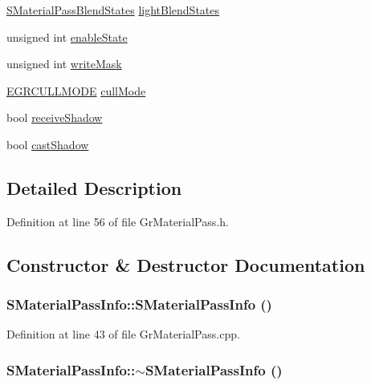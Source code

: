 \begin{CompactItemize}
\item 
\hyperlink{struct_s_material_pass_blend_states}{SMaterialPassBlendStates} \hyperlink{struct_s_material_pass_info_1bb1369eafd762e7b2adc9b456fae885}{lightBlendStates}
\item 
unsigned int \hyperlink{struct_s_material_pass_info_b4f60776995332748e40270d6c2dc318}{enableState}
\item 
unsigned int \hyperlink{struct_s_material_pass_info_06ba69d3100e1ce0a27d8da74c1f342d}{writeMask}
\item 
\hyperlink{_gr_util_8h_ea790ef067767354691d0d60c51542fe}{EGRCULLMODE} \hyperlink{struct_s_material_pass_info_1c5a2ded6a57901feed193d620db014e}{cullMode}
\item 
bool \hyperlink{struct_s_material_pass_info_47b874b3efb05afc0ccbecc01ebf62bc}{receiveShadow}
\item 
bool \hyperlink{struct_s_material_pass_info_148b9b02c76e38c6be30dc599ad35dad}{castShadow}
\end{CompactItemize}


\subsection{Detailed Description}


Definition at line 56 of file GrMaterialPass.h.

\subsection{Constructor \& Destructor Documentation}
\hypertarget{struct_s_material_pass_info_188cd731132ec93cdb46f1b94a34d9eb}{
\subsubsection[{SMaterialPassInfo}]{\setlength{\rightskip}{0pt plus 5cm}SMaterialPassInfo::SMaterialPassInfo ()}}
\label{struct_s_material_pass_info_188cd731132ec93cdb46f1b94a34d9eb}




Definition at line 43 of file GrMaterialPass.cpp.\hypertarget{struct_s_material_pass_info_2c919007aec4f01db30c5eaa03d5470c}{
\subsubsection[{$\sim$SMaterialPassInfo}]{\setlength{\rightskip}{0pt plus 5cm}SMaterialPassInfo::$\sim$SMaterialPassInfo ()}}
\label{struct_s_material_pass_info_2c919007aec4f01db30c5eaa03d5470c}





